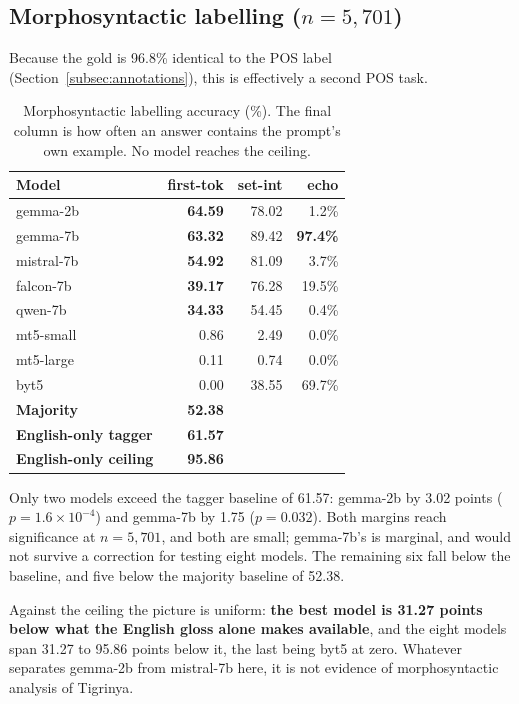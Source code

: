 \documentclass[11pt]{article}
\begin{document}
\subsection{Morphosyntactic labelling ($n = 5{,}701$)}
\label{subsec:morph}

Because the gold is 96.8\% identical to the POS label
(Section~\ref{subsec:annotations}), this is effectively a second POS task.

\begin{table}[tb]
\centering
\setlength{\tabcolsep}{4pt}
\begin{tabular}{lrrr}
\toprule
Model & \textbf{first-tok} & set-int & echo \\
\midrule
gemma-2b   & \textbf{64.59} & 78.02 & 1.2\% \\
gemma-7b   & \textbf{63.32} & 89.42 & \textbf{97.4\%} \\
mistral-7b & \textbf{54.92} & 81.09 & 3.7\% \\
falcon-7b  & \textbf{39.17} & 76.28 & 19.5\% \\
qwen-7b    & \textbf{34.33} & 54.45 & 0.4\% \\
mt5-small  &          0.86  &  2.49 & 0.0\% \\
mt5-large  &          0.11  &  0.74 & 0.0\% \\
byt5       &          0.00  & 38.55 & 69.7\% \\
\midrule
\textbf{Majority}             & \textbf{52.38} & & \\
\textbf{English-only tagger}  & \textbf{61.57} & & \\
\textbf{English-only ceiling} & \textbf{95.86} & & \\
\bottomrule
\end{tabular}
\caption{Morphosyntactic labelling accuracy (\%). The final column is how
often an answer contains the prompt's own example. No model reaches the
ceiling.}
\label{tab:morph}
\end{table}

Only two models exceed the tagger baseline of 61.57: gemma-2b by 3.02 points
($p = 1.6 \times 10^{-4}$) and gemma-7b by 1.75 ($p = 0.032$). Both margins
reach significance at $n = 5{,}701$, and both are small; gemma-7b's is
marginal, and would not survive a correction for testing eight models. The
remaining six fall below the baseline, and five below the majority baseline
of 52.38.

Against the ceiling the picture is uniform: \textbf{the best model is 31.27
points below what the English gloss alone makes available}, and the eight
models span 31.27 to 95.86 points below it, the last being byt5 at zero. Whatever separates gemma-2b from
mistral-7b here, it is not evidence of morphosyntactic analysis of Tigrinya.
\end{document}
